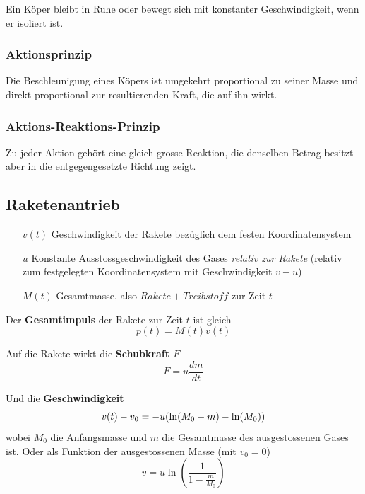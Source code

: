 \documentclass[7pt]{article}
\begin{document}
\begin{multicols*}{3}
Ein Köper bleibt in Ruhe oder bewegt sich mit konstanter Geschwindigkeit, wenn er isoliert ist.

\subsubsection{Aktionsprinzip}

Die Beschleunigung eines Köpers ist umgekehrt proportional zu seiner Masse und direkt proportional zur resultierenden Kraft, die auf ihn wirkt. 

\subsubsection{Aktions-Reaktions-Prinzip}

Zu jeder Aktion gehört eine gleich grosse Reaktion, die denselben Betrag besitzt aber in die entgegengesetzte Richtung zeigt.

\subsection{Raketenantrieb}

\begin{enumerate}
	\item [$v(t)$] Geschwindigkeit der Rakete bezüglich dem festen Koordinatensystem
	\item [$u$] Konstante Ausstossgeschwindigkeit des Gases \emph{relativ zur Rakete} (relativ zum festgelegten Koordinatensystem mit Geschwindigkeit $v-u$)
	\item [$M(t)$] Gesamtmasse, also $Rakete + Treibstoff$ zur Zeit $t$
\end{enumerate}

Der \textbf{Gesamtimpuls} der Rakete zur Zeit $t$ ist gleich
\begin{equation*}
	p(t) = M(t)v(t)
\end{equation*}

Auf die Rakete wirkt die \textbf{Schubkraft $F$}
\begin{equation*}
	F = u\frac{dm}{dt}
\end{equation*}

Und die \textbf{Geschwindigkeit}
\begin{equation*}
	v(t) - v_0 = -u(\ln(M_0 - m) - \ln(M_0))\\
\end{equation*}
wobei $M_0$ die Anfangsmasse und $m$ die Gesamtmasse des ausgestossenen Gases ist. \newline
Oder als Funktion der ausgestossenen Masse (mit $v_0 = 0$)
\begin{equation*}
	v = u\ln(\frac{1}{1-\frac{m}{M_0}})
\end{equation*}


\end{multicols*}
\end{document}
